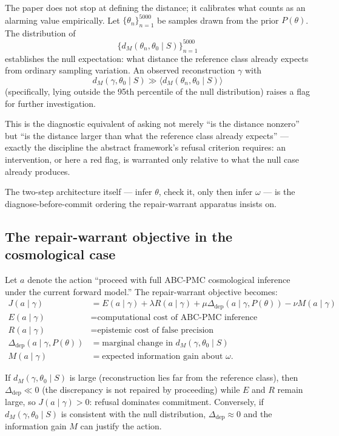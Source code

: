 \documentclass[11pt]{article}
\newcommand{\Ddep}{\Delta_{\mathrm{dep}}}
\newcommand{\Repobj}{J}
\begin{document}
The paper does not stop at defining the distance; it calibrates what counts as an alarming value empirically. Let $\{\theta_n\}_{n=1}^{5000}$ be samples drawn from the prior $P(\theta)$. The distribution of
\[
\{d_M(\theta_n,\theta_0\mid S)\}_{n=1}^{5000}
\]
establishes the null expectation: what distance the reference class already expects from ordinary sampling variation. An observed reconstruction $\gamma$ with
\[
d_M(\gamma,\theta_0\mid S) \gg \langle d_M(\theta_n,\theta_0\mid S) \rangle
\]
(specifically, lying outside the 95th percentile of the null distribution) raises a flag for further investigation.

This is the diagnostic equivalent of asking not merely ``is the distance nonzero'' but ``is the distance larger than what the reference class already expects'' --- exactly the discipline the abstract framework's refusal criterion requires: an intervention, or here a red flag, is warranted only relative to what the null case already produces.

The two-step architecture itself --- infer $\theta$, check it, only then infer $\omega$ --- is the diagnose-before-commit ordering the repair-warrant apparatus insists on. 

\subsection{The repair-warrant objective in the cosmological case}

Let $a$ denote the action ``proceed with full ABC-PMC cosmological inference under the current forward model.'' The repair-warrant objective becomes:
\begin{align*}
\Repobj(a\mid \gamma) &= E(a\mid \gamma) + \lambda R(a\mid \gamma) + \mu \Ddep(a\mid \gamma, P(\theta)) - \nu M(a\mid \gamma) \\
E(a\mid \gamma) &= \text{computational cost of ABC-PMC inference} \\
R(a\mid \gamma) &= \text{epistemic cost of false precision} \\
\Ddep(a\mid \gamma, P(\theta)) &= \text{marginal change in } d_M(\gamma, \theta_0 \mid S) \\
M(a\mid \gamma) &= \text{expected information gain about } \omega.
\end{align*}

If $d_M(\gamma, \theta_0 \mid S)$ is large (reconstruction lies far from the reference class), then $\Ddep \ll 0$ (the discrepancy is not repaired by proceeding) while $E$ and $R$ remain large, so $\Repobj(a\mid \gamma) > 0$: refusal dominates commitment. Conversely, if $d_M(\gamma, \theta_0 \mid S)$ is consistent with the null distribution, $\Ddep \approx 0$ and the information gain $M$ can justify the action.
\end{document}
